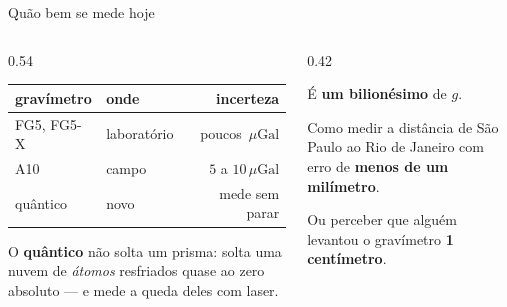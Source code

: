 \documentclass[aspectratio=169,11pt]{beamer}
\newcommand{\bnum}[1]{\textbf{\textcolor{mTeal}{#1}}}
\newcommand{\uGal}{\ensuremath{\,\mu\mathrm{Gal}}\xspace}
\begin{document}
\begin{frame}{Quão bem se mede hoje}
  \begin{columns}[T]
    \begin{column}{0.54\textwidth}
      \centering
      \small
      \renewcommand{\arraystretch}{1.4}
      \begin{tabular}{llr}
        \toprule
        gravímetro & onde & incerteza \\
        \midrule
        FG5, FG5-X & laboratório & poucos \uGal \\
        A10 & campo & $5$ a $10$\uGal \\
        quântico & novo & mede sem parar \\
        \bottomrule
      \end{tabular}
      \medskip
      \flushleft
      {\small O \textbf{quântico} não solta um prisma: solta uma nuvem de \emph{átomos}
      resfriados quase ao zero absoluto --- e mede a queda deles com laser.}
    \end{column}
    \begin{column}{0.42\textwidth}
      \begin{ideia}[title={Poucos $\mu$Gal é quanto?}]
        É \bnum{um bilionésimo} de $g$.
        \medskip

        Como medir a distância de São Paulo ao Rio de Janeiro com erro de \bnum{menos de um
        milímetro}.
        \medskip

        Ou perceber que alguém levantou o gravímetro \bnum{1 centímetro}.
      \end{ideia}
    \end{column}
  \end{columns}
\end{frame}
\end{document}
